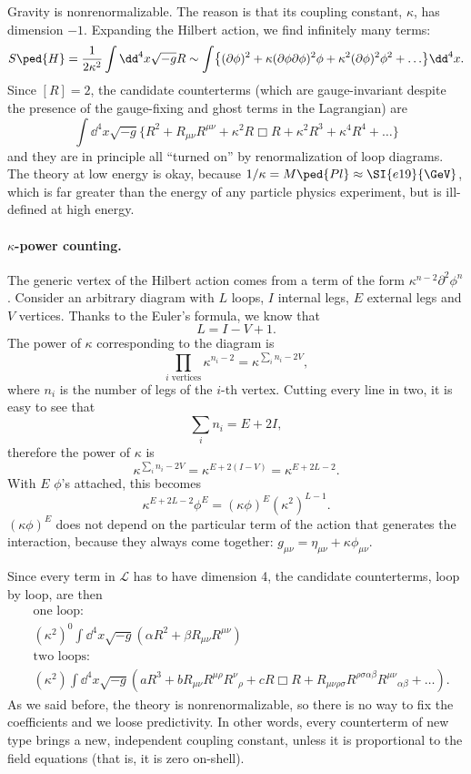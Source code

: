 \documentclass[a4paper,12pt]{book}
\begin{document}
Gravity is nonrenormalizable. The reason is that its coupling constant, $\kappa$, has dimension $-1$. Expanding the Hilbert action, we find infinitely many terms:
\[S\ped{H}=\frac1{2\kappa^2}\int\dd^4x\sqrt{-g}R\sim\int\bigl\{(\partial\phi)^2+\kappa(\partial\phi\partial\phi)^2\phi+\kappa^2(\partial\phi)^2\phi^2+\ldots\bigr\}\dd^4x.\]
Since $[R]=2$, the candidate counterterms (which are gauge-invariant despite the presence of the gauge-fixing and ghost terms in the Lagrangian) are
\[\int\dd^4x\sqrt{-g}\bigl\{R^2+R_{\mu\nu}R^{\mu\nu}+\kappa^2R\Box R+\kappa^2R^3+\kappa^4R^4+\ldots\bigr\}\]
and they are in principle all ``turned on'' by renormalization of loop diagrams. The theory at low energy is okay, because $1/\kappa=M\ped{Pl}\approx\SI{e19}{\GeV}$, which is far greater than the energy of any particle physics experiment, but is ill-defined at high energy.

\paragraph{$\kappa$-power counting.}
The generic vertex of the Hilbert action comes from a term of the form $\kappa^{n-2}\partial^2\phi^n$. Consider an arbitrary diagram with $L$ loops, $I$ internal legs, $E$ external legs and $V$ vertices. Thanks to the Euler's formula, we know that
\[L=I-V+1.\]
The power of $\kappa$ corresponding to the diagram is
\[\prod_{i\text{ vertices}}\kappa^{n_i-2}=\kappa^{\sum_in_i-2V},\]
where $n_i$ is the number of legs of the $i$-th vertex. Cutting every line in two, it is easy to see that
\[\sum_in_i=E+2I,\]
therefore the power of $\kappa$ is
\[\kappa^{\sum_in_i-2V}=\kappa^{E+2(I-V)}=\kappa^{E+2L-2}.\]
With $E$ $\phi$'s attached, this becomes
\[\kappa^{E+2L-2}\phi^E=(\kappa\phi)^E(\kappa^2)^{L-1}.\]
$(\kappa\phi)^E$ does not depend on the particular term of the action that generates the interaction, because they always come together: $g_{\mu\nu}=\eta_{\mu\nu}+\kappa\phi_{\mu\nu}$.

Since every term in $\mathcal L$ has to have dimension 4, the candidate counterterms, loop by loop, are then
\begin{align*}
&\text{one loop: }\\
&(\kappa^2)^0\int\dd^4x\sqrt{-g}(\alpha R^2+\beta R_{\mu\nu}R^{\mu\nu})\\
&\text{two loops: }\\
&(\kappa^2)\int\dd^4x\sqrt{-g}(a R^3+b R_{\mu\nu}R^{\mu\rho}R^\nu{}_\rho+cR\Box R+R_{\mu\nu\rho\sigma}R^{\rho\sigma\alpha\beta}R^{\mu\nu}{}_{\alpha\beta}+\ldots).
\end{align*}
As we said before, the theory is nonrenormalizable, so there is no way to fix the coefficients and we loose predictivity. In other words, every counterterm of new type brings a new, independent coupling constant, unless it is proportional to the field equations (that is, it is zero on-shell).
\end{document}
